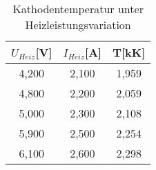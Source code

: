\begin{table}[h]
	\begin{center}
		\begin{tabular}{ccc}
			$U_{Heiz}$[V]&$I_{Heiz}$[A]&T[kK] \\ \hline
			4{,}200&2{,}100&1{,}959\\
			4{,}800&2{,}200&2{,}059\\
			5{,}000&2{,}300&2{,}108\\
			5{,}900&2{,}500&2{,}254\\
			6{,}100&2{,}600&2{,}298
		\end{tabular}
		\caption{Kathodentemperatur unter Heizleistungsvariation}
		\label{tabd1}
	\end{center}
\end{table}